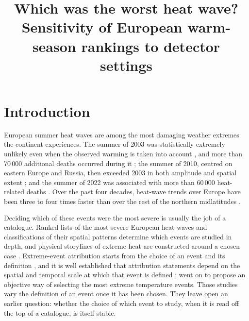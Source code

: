 \documentclass{amsdraft}
\title{Which was the worst heat wave? Sensitivity of European warm-season
rankings to detector settings}
\affiliation{Memorial University of Newfoundland, St. John's,
Newfoundland and Labrador, Canada}
\begin{document}
\maketitle


\section{Introduction}
\label{sec:intro}

European summer heat waves are among the most damaging weather extremes the
continent experiences. The summer of 2003 was statistically extremely
unlikely even when the observed warming is taken into account
\citep{Schar2004}, and more than 70\,000 additional deaths occurred during it
\citep{Robine2008}; the summer of 2010, centred on eastern Europe and Russia,
then exceeded 2003 in both amplitude and spatial extent
\citep{Barriopedro2011}; and the summer of 2022 was associated with more than
60\,000 heat-related deaths \citep{Ballester2023}. Over the past four decades,
heat-wave trends over Europe have been three to four times faster than over
the rest of the northern midlatitudes \citep{Rousi2022}.

Deciding which of these events were the most severe is usually the job of a
catalogue. Ranked lists of the most severe European heat waves
\citep{Russo2015,Becker2022,LhotkaKysely2022} and classifications of their
spatial patterns \citep{Stefanon2012} determine which events are studied in
depth, and physical storylines of extreme heat are constructed around a
chosen case \citep{WhittakerDiLuca2026}. Extreme-event attribution starts
from the choice of an event and its definition \citep{Philip2020}, and it is
well established that attribution statements depend on the spatial and
temporal scale at which that event is defined
\citep{Angelil2014,CattiauxRibes2018,Leach2020}; \citet{Cattiaux2024} went on
to propose an objective way of selecting the most extreme temperature events.
Those studies vary the definition of an event once it has been chosen. They
leave open an earlier question: whether the choice of which event to study,
when it is read off the top of a catalogue, is itself stable.
\end{document}

